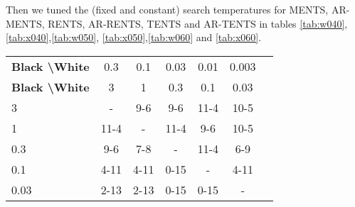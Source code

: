 \documentclass{article}
\theoremstyle{plain}
\begin{document}
\begin{appendices}
            
            
            
            
            
            
            
            
            Then we tuned the (fixed and constant) search temperatures for MENTS, AR-MENTS, RENTS, AR-RENTS, TENTS and AR-TENTS in tables \ref{tab:w040}, \ref{tab:x040},\ref{tab:w050}, \ref{tab:x050},\ref{tab:w060} and \ref{tab:x060}.
            
            
            
            
            \begin{table*}[]
            \centering
                \begin{tabular}{l|cccccc}
                    \textbf{Black \textbackslash White}     & 0.3  & 0.1   & 0.03   & 0.01    & 0.003    \\ 
                    \textbf{Black \textbackslash White}     & 3  & 1   & 0.3   & 0.1    & 0.03    \\ 
                    \hline
                                            3            & -     	&   	9-6	&  9-6 		&   	11-4	&  10-5 		\\
                                            1            & 11-4  		& -     	&  11-4		&  9-6 		& 10-5  		\\
                                            0.3          &  9-6  	&  7-8  	&   -   &  11-4 		&  6-9 		\\
                                            0.1          &  4-11 		&   4-11		&   0-15		& -     	&  4-11 		\\
                                            0.03         &   	2-13	&  2-13 		&  0-15 		&   0-15		&   -   	\\      
                \end{tabular}
                \caption{Results for round robin to select the temperature parameter $\alpha$ for MENTS. The value of 1.0 won the most matches so was selected. \label{tab:w040}}
            \end{table*}
            

\end{appendices}
\end{document}

